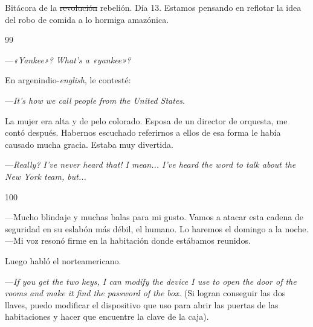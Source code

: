 \documentclass[12pt,twoside,openright,a5paper]{book}
\begin{document}
\nopagebreak

\vspace{0.5cm}

\nopagebreak

Bitácora de la \st{revolución} rebelión. Día 13. Estamos pensando en reflotar la idea
del robo de comida a lo hormiga amazónica.

\vspace{0.5cm}

\hrulefill \hspace{0.1cm}\decofourleft\hspace{0.2cm} 99 \hspace{0.2cm}\decofourright \hspace{0.1cm}\hrulefill

\nopagebreak

\vspace{0.5cm}

\nopagebreak

---\emph{«Yankee»? What's a «yankee»?}

En argenindio-\emph{english}, le contesté:

---\emph{It's how we call people from the United States}.

La mujer era alta y de pelo colorado. Esposa de un director de orquesta, me contó después. Habernos escuchado referirnos a ellos de esa forma le había causado mucha gracia. Estaba muy divertida. 

---\emph{Really? I've never heard that! I mean... I've heard the word to talk about the New York team, but...}

\vspace{0.5cm}

\hrulefill \hspace{0.1cm}\decofourleft\hspace{0.2cm} 100 \hspace{0.2cm}\decofourright \hspace{0.1cm}\hrulefill

\nopagebreak

\vspace{0.5cm}

\nopagebreak

---Mucho blindaje y muchas balas para mi gusto. Vamos a atacar esta cadena
de seguridad en su eslabón más débil, el humano. Lo haremos el domingo a la noche. ---Mi voz resonó firme en la habitación
donde estábamos reunidos.

Luego habló el norteamericano.

---\emph{If you get the two keys, I can modify the device I use to open the door of the rooms 
and make it find the password of the box.} (Si logran conseguir las dos llaves,
puedo modificar el dispositivo que uso para abrir las puertas de las habitaciones y
hacer que encuentre la clave de la caja).
\end{document}
